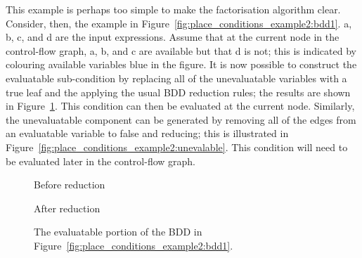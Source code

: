 This example is perhaps too simple to make the factorisation algorithm
clear.  Consider, then, the example in
Figure~\ref{fig:place_conditions_example2:bdd1}.  a, b, c, and d are
the input expressions.  Assume that at the current node in the
control-flow graph, a, b, and c are available but that d is not; this
is indicated by colouring available variables blue in the figure.  It
is now possible to construct the evaluatable sub-condition by
replacing all of the unevaluatable variables with a true leaf and the
applying the usual BDD reduction rules; the results are shown in
Figure~\ref{fig:place_conditions_example2:evalable}.  This condition
can then be evaluated at the current node.  Similarly, the
unevaluatable component can be generated by removing all of the edges
from an evaluatable variable to false and reducing; this is
illustrated in Figure~\ref{fig:place_conditions_example2:unevalable}.
This condition will need to be evaluated later in the control-flow
graph.


\begin{figure}
  \begin{subfloat}
    \caption{Before reduction}
  \end{subfloat}
  \begin{subfloat}
    \caption{After reduction}
  \end{subfloat}
  \caption{The evaluatable portion of the BDD in
    Figure~\ref{fig:place_conditions_example2:bdd1}.}
  \label{fig:place_conditions_example2:evalable}
\end{figure}

